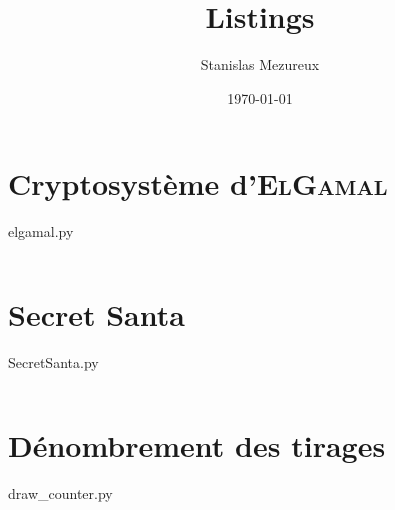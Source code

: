 \documentclass[12pt]{report}
\title{Listings}
\author{Stanislas Mezureux}
\date{\today}
\begin{document}
\maketitle

\renewcommand{\labelitemi}{$\color{mainColor}{\rhd}$}

\section{Cryptosystème d'\textsc{ElGamal}}
    \begin{longlisting}
        \caption{elgamal.py}
        \inputminted[linenos, breaklines, autogobble]{python}{../elgamal.py}
    \end{longlisting}

\section{Secret Santa}
    \begin{longlisting}
        \caption{SecretSanta.py}
        \inputminted[linenos, breaklines, autogobble]{python}{../SecretSanta.py}
    \end{longlisting}

\section{Dénombrement des tirages}
    \begin{longlisting}
        \caption{draw\_counter.py}
        \inputminted[linenos, breaklines, autogobble]{python}{../draw_counter.py}
    \end{longlisting}
            
\end{document}
